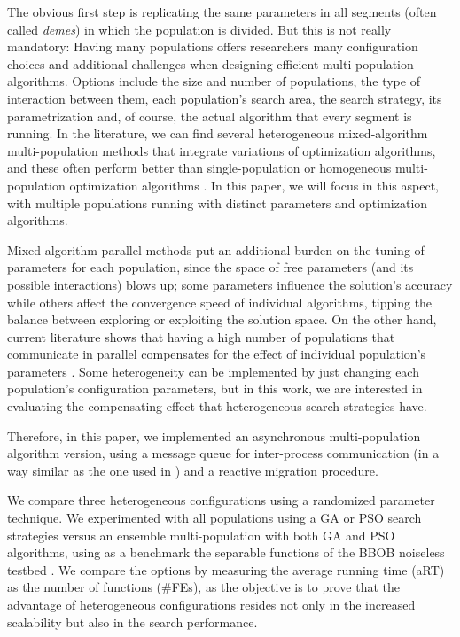 \documentclass[runningheads]{llncs}
\begin{document}
The obvious first step is replicating the same parameters in all
segments (often called {\em demes}) in which the population is
divided. But this is not really mandatory: Having many populations
offers researchers many configuration choices and additional
challenges when designing efficient multi-population algorithms.
Options include the size and number of populations, the type of
interaction between them, each population's search area, the search
strategy, its parametrization and, of course, the actual algorithm
that every segment is running. In the literature, we can find several
heterogeneous mixed-algorithm multi-population methods that integrate
variations of optimization algorithms, and these often perform better
than single-population or homogeneous multi-population optimization
algorithms \cite{wu2016differential,nseef2016adaptive}. In this paper,
we will focus in this aspect, with multiple populations running with
distinct parameters and optimization algorithms.

Mixed-algorithm parallel methods put an
additional burden on the tuning of parameters for each population,
since the space of free parameters (and its possible interactions)
blows up; some
parameters influence the solution's accuracy while others affect the convergence
speed of individual algorithms, tipping the balance between exploring or
exploiting the solution space. On the other hand, current literature shows that
having a high number of populations that communicate in parallel
compensates %
for
the effect of individual population's parameters
\cite{li2016multi,tanabe2013evaluation}. Some heterogeneity can be implemented
by just changing each population's configuration parameters, but in this work,
we are interested in evaluating the compensating effect that heterogeneous
search strategies have. %

Therefore, in this paper, we implemented an asynchronous
multi-population algorithm version, using a message queue for inter-process
communication (in a way similar as the one used in
\cite{guervos2018introducing}) and a reactive migration procedure. %

We compare three heterogeneous configurations using a randomized parameter
technique. %
We experimented with all populations using a GA or PSO search
strategies versus an ensemble multi-population with both GA and PSO algorithms,
using as a benchmark the separable functions of the BBOB noiseless testbed
\cite{hansen2009real}. We compare the options by measuring the average running
time (aRT) as the number of functions (\#FEs), as the objective is to prove that
the advantage of heterogeneous configurations resides not only in the increased
scalability but also in the search performance. %
\end{document}
